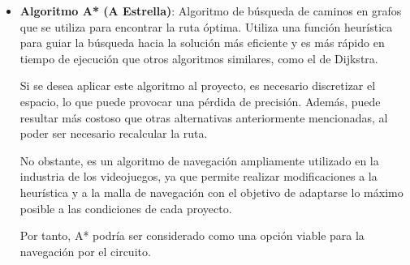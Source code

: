 \begin{itemize}
   \item \textbf{Algoritmo A* (A Estrella)}: Algoritmo de búsqueda de caminos en grafos que se utiliza para encontrar la ruta óptima. Utiliza una función heurística para guiar la búsqueda hacia la solución más eficiente y es más rápido en tiempo de ejecución que otros algoritmos similares, como el de Dijkstra.
   
   Si se desea aplicar este algoritmo al proyecto, es necesario discretizar el espacio, lo que puede provocar una pérdida de precisión. Además, puede resultar más costoso que otras alternativas anteriormente mencionadas, al poder ser necesario recalcular la ruta.

   No obstante, es un algoritmo de navegación ampliamente utilizado en la industria de los videojuegos, ya que permite realizar modificaciones a la heurística y a la malla de navegación con el objetivo de adaptarse lo máximo posible a las condiciones de cada proyecto.

   Por tanto, A* podría ser considerado como una opción viable para la navegación por el circuito.

\end{itemize}